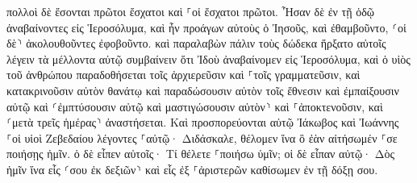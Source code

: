 \documentclass{openreader}
\begin{document}
πολλοὶ δὲ ἔσονται πρῶτοι ἔσχατοι καὶ ⸀οἱ ἔσχατοι πρῶτοι. 
Ἦσαν δὲ ἐν τῇ ὁδῷ ἀναβαίνοντες εἰς Ἱεροσόλυμα, καὶ ἦν προάγων αὐτοὺς ὁ Ἰησοῦς, καὶ ἐθαμβοῦντο, ⸂οἱ δὲ⸃ ἀκολουθοῦντες ἐφοβοῦντο. καὶ παραλαβὼν πάλιν τοὺς δώδεκα ἤρξατο αὐτοῖς λέγειν τὰ μέλλοντα αὐτῷ συμβαίνειν 
ὅτι Ἰδοὺ ἀναβαίνομεν εἰς Ἱεροσόλυμα, καὶ ὁ υἱὸς τοῦ ἀνθρώπου παραδοθήσεται τοῖς ἀρχιερεῦσιν καὶ ⸀τοῖς γραμματεῦσιν, καὶ κατακρινοῦσιν αὐτὸν θανάτῳ καὶ παραδώσουσιν αὐτὸν τοῖς ἔθνεσιν 
καὶ ἐμπαίξουσιν αὐτῷ καὶ ⸂ἐμπτύσουσιν αὐτῷ καὶ μαστιγώσουσιν αὐτὸν⸃ καὶ ⸀ἀποκτενοῦσιν, καὶ ⸂μετὰ τρεῖς ἡμέρας⸃ ἀναστήσεται. 
Καὶ προσπορεύονται αὐτῷ Ἰάκωβος καὶ Ἰωάννης ⸀οἱ υἱοὶ Ζεβεδαίου λέγοντες ⸀αὐτῷ· Διδάσκαλε, θέλομεν ἵνα ὃ ἐὰν αἰτήσωμέν ⸀σε ποιήσῃς ἡμῖν. 
ὁ δὲ εἶπεν αὐτοῖς· Τί θέλετε ⸀ποιήσω ὑμῖν; 
οἱ δὲ εἶπαν αὐτῷ· Δὸς ἡμῖν ἵνα εἷς ⸂σου ἐκ δεξιῶν⸃ καὶ εἷς ἐξ ⸀ἀριστερῶν καθίσωμεν ἐν τῇ δόξῃ σου. 
\end{document}
